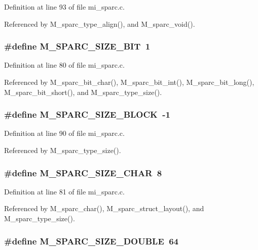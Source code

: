 Definition at line 93 of file mi\_\-sparc.c.

Referenced by M\_\-sparc\_\-type\_\-align(), and M\_\-sparc\_\-void().
\subsubsection{\setlength{\rightskip}{0pt plus 5cm}\#define M\_\-SPARC\_\-SIZE\_\-BIT~1}\label{mi__sparc_8c_fd0c82eb4c0bea72f96a5d6ec1982097}




Definition at line 80 of file mi\_\-sparc.c.

Referenced by M\_\-sparc\_\-bit\_\-char(), M\_\-sparc\_\-bit\_\-int(), M\_\-sparc\_\-bit\_\-long(), M\_\-sparc\_\-bit\_\-short(), and M\_\-sparc\_\-type\_\-size().
\subsubsection{\setlength{\rightskip}{0pt plus 5cm}\#define M\_\-SPARC\_\-SIZE\_\-BLOCK~-1}\label{mi__sparc_8c_622000ad1b37191e51842a586883f55b}




Definition at line 90 of file mi\_\-sparc.c.

Referenced by M\_\-sparc\_\-type\_\-size().
\subsubsection{\setlength{\rightskip}{0pt plus 5cm}\#define M\_\-SPARC\_\-SIZE\_\-CHAR~8}\label{mi__sparc_8c_6b897d6238824458ceecf4591a5b31ee}




Definition at line 81 of file mi\_\-sparc.c.

Referenced by M\_\-sparc\_\-char(), M\_\-sparc\_\-struct\_\-layout(), and M\_\-sparc\_\-type\_\-size().
\subsubsection{\setlength{\rightskip}{0pt plus 5cm}\#define M\_\-SPARC\_\-SIZE\_\-DOUBLE~64}\label{mi__sparc_8c_51c6614b9618d50e5aa8a20af752d38b}




